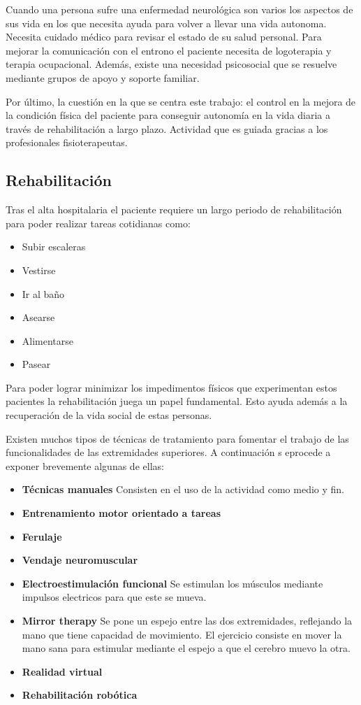 Cuando una persona sufre una enfermedad neurológica son varios los aspectos de sus vida en los que necesita ayuda para volver a llevar una vida autonoma. Necesita cuidado médico para revisar el estado de su salud personal. Para mejorar la comunicación con el entrono el paciente necesita de logoterapia y terapia ocupacional. Además, existe una necesidad psicosocial que se resuelve mediante grupos de apoyo y soporte familiar.

Por último, la cuestión en la que se centra este trabajo: el control en la mejora de la condición física del paciente para conseguir autonomía en la vida diaria a través de rehabilitación a largo plazo. Actividad que es guiada gracias a los profesionales fisioterapeutas.

\subsection{Rehabilitación}
\label{sec:neuronal2}

Tras el alta hospitalaria el paciente requiere un largo periodo de rehabilitación para poder realizar tareas cotidianas como\cite{secuelasIctus}:
\begin{itemize}
	\item Subir escaleras
	\item Vestirse
	\item Ir al baño
	\item Asearse
	\item Alimentarse
	\item Pasear
\end{itemize}

Para poder lograr minimizar los impedimentos físicos que experimentan estos pacientes la rehabilitación juega un papel fundamental. Esto ayuda además a la recuperación de la vida social de estas personas. 

Existen muchos tipos de técnicas de tratamiento para fomentar el trabajo de las funcionalidades de las extremidades superiores. A continuación s eprocede a exponer brevemente algunas de ellas:

\begin{itemize}[label=$ \rhd $]
	\item \textbf{Técnicas manuales} Consisten en el uso de la actividad como medio y fin.
	\item \textbf{Entrenamiento motor orientado a tareas}
	\item \textbf{Ferulaje}
	\item \textbf{Vendaje neuromuscular}
	\item \textbf{Electroestimulación funcional} Se estimulan los músculos mediante impulsos electricos para que este se mueva.
	\item \textbf{Mirror therapy} Se pone un espejo entre las dos extremidades, reflejando la mano que tiene capacidad de movimiento. El ejercicio consiste en mover la mano sana para estimular mediante el espejo a que el cerebro muevo la otra.
	\item \textbf{Realidad virtual}
	\item \textbf{Rehabilitación robótica}
\end{itemize}


